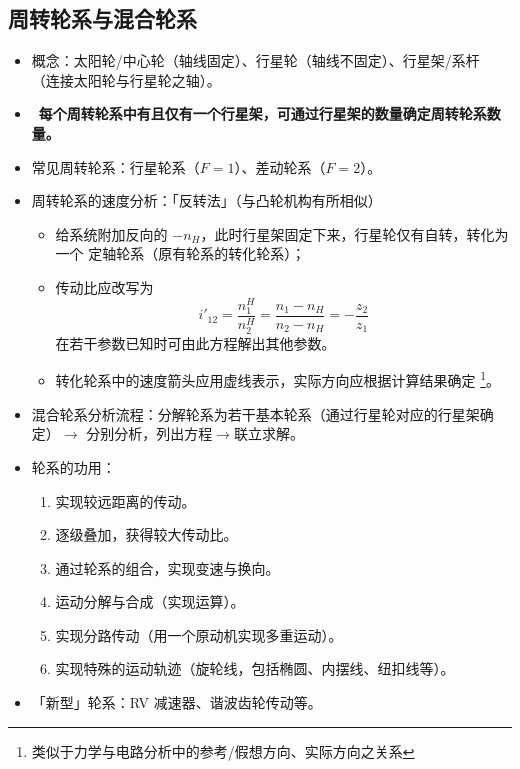 \documentclass[12pt,a4paper]{article}
\newcommand{\tightlist}{\setlength{\parskip}{0pt}\setlength{\itemsep}{0pt}}
\newcommand{\hint}[1]{\textsf{（#1）}}
\newcommand{\minor}[1]{{\color{gray} #1}}
\newcommand{\then}{$\to$}
\renewcommand{\emph}[1]{\faIcon[regular]{lightbulb}\ \textbf{#1}}
\begin{document}
\subsection{周转轮系与混合轮系}
\begin{itemize}\tightlist
    \item 概念：太阳轮/中心轮\hint{轴线固定}、行星轮\hint{轴线不固定}、行星架/系杆
    \hint{连接太阳轮与行星轮之轴}。
    \item \emph{每个周转轮系中有且仅有一个行星架，可通过行星架的数量确定周转轮系数量。}
    \item 常见周转轮系：行星轮系\hint{$F=1$}、差动轮系\hint{$F=2$}。
    \item 周转轮系的速度分析：「反转法」\hint{与凸轮机构有所相似}
    \begin{itemize}\tightlist
        \item 给系统附加反向的 $-n_H$，此时行星架固定下来，行星轮仅有自转，转化为一个
        定轴轮系\hint{原有轮系的转化轮系}；
        \item 传动比应改写为
        \begin{equation}
        i'_{12}=\frac{n_1^H}{n_2^H}=\frac{n_1-n_H}{n_2-n_H}=-\frac{z_2}{z_1}
        \end{equation}
        在若干参数已知时可由此方程解出其他参数。
        \item 转化轮系中的速度箭头应用虚线表示，实际方向应根据计算结果确定
        \footnote{类似于力学与电路分析中的参考/假想方向、实际方向之关系}。
    \end{itemize}
    \item 混合轮系分析流程：分解轮系为若干基本轮系\hint{通过行星轮对应的行星架确定}\then
    分别分析，列出方程\then 联立求解。
    \item 轮系的功用：
    \begin{enumerate}\tightlist
        \item 实现较远距离的传动。
        \item 逐级叠加，获得较大传动比。
        \item 通过轮系的组合，实现变速与换向。
        \item \minor{运动分解与合成\hint{实现运算}。}
        \item 实现分路传动\hint{用一个原动机实现多重运动}。
        \item \minor{实现特殊的运动轨迹\hint{旋轮线，包括椭圆、内摆线、纽扣线等}。}
    \end{enumerate}
    \item \minor{「新型」轮系：RV 减速器、谐波齿轮传动等。}
\end{itemize}
\end{document}
